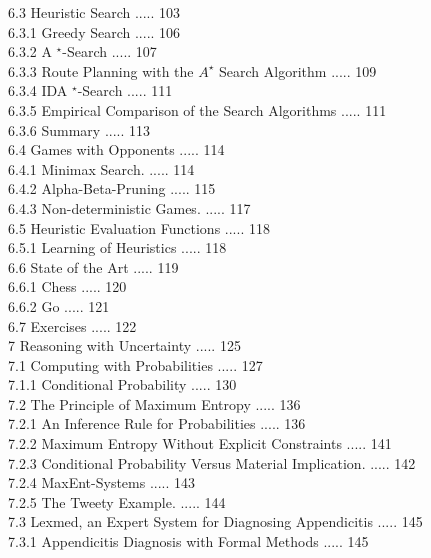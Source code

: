 \documentclass[10pt]{book}
\begin{document}
6.3 Heuristic Search ..... 103\\
6.3.1 Greedy Search ..... 106\\
6.3.2 A ${ }^{\star}$-Search ..... 107\\
6.3.3 Route Planning with the $A^{\star}$ Search Algorithm ..... 109\\
6.3.4 IDA ${ }^{\star}$-Search ..... 111\\
6.3.5 Empirical Comparison of the Search Algorithms ..... 111\\
6.3.6 Summary ..... 113\\
6.4 Games with Opponents ..... 114\\
6.4.1 Minimax Search. ..... 114\\
6.4.2 Alpha-Beta-Pruning ..... 115\\
6.4.3 Non-deterministic Games. ..... 117\\
6.5 Heuristic Evaluation Functions ..... 118\\
6.5.1 Learning of Heuristics ..... 118\\
6.6 State of the Art ..... 119\\
6.6.1 Chess ..... 120\\
6.6.2 Go ..... 121\\
6.7 Exercises ..... 122\\
7 Reasoning with Uncertainty ..... 125\\
7.1 Computing with Probabilities ..... 127\\
7.1.1 Conditional Probability ..... 130\\
7.2 The Principle of Maximum Entropy ..... 136\\
7.2.1 An Inference Rule for Probabilities ..... 136\\
7.2.2 Maximum Entropy Without Explicit Constraints ..... 141\\
7.2.3 Conditional Probability Versus Material Implication. ..... 142\\
7.2.4 MaxEnt-Systems ..... 143\\
7.2.5 The Tweety Example. ..... 144\\
7.3 Lexmed, an Expert System for Diagnosing Appendicitis ..... 145\\
7.3.1 Appendicitis Diagnosis with Formal Methods ..... 145\\
\end{document}

